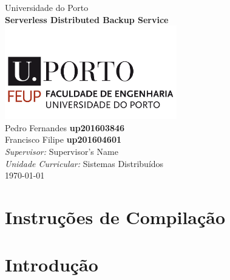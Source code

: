 \documentclass[11pt,oneside]{book}
\begin{document}

\frontmatter

\begin{titlepage}

\begin{center}
{\LARGE Universidade do Porto}\\[1.5cm]
\linespread{1.2}\huge {\bfseries Serverless Distributed Backup Service}\\[1.5cm]
\linespread{1}
\includegraphics[width=7.5cm]{feup.png}\\[1cm]
{\Large Pedro Fernandes \textbf{up201603846}}\\
{\Large Francisco Filipe \textbf{up201604601}}\\[1cm]
{\large \emph{Supervisor:} Supervisor's Name}\\
{\large \emph{Unidade Curricular:} Sistemas Distribuídos}\\
\today
\end{center}

\end{titlepage}


\tableofcontents


\mainmatter
\section{Instruções de Compilação}

\section{Introdução}
\end{document}

